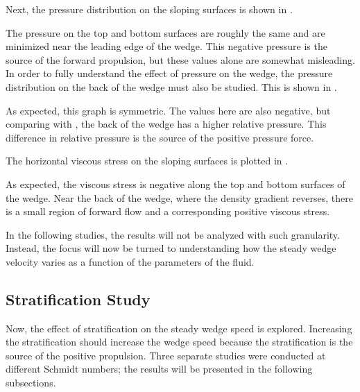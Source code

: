 \documentclass[12pt]{article}
\begin{document}
Next, the pressure distribution on the sloping surfaces is shown in .


The pressure on the top and bottom surfaces are roughly the same and are minimized near the leading edge of the wedge. This negative pressure is the source of the forward propulsion, but these values alone are somewhat misleading. In order to fully understand the effect of pressure on the wedge, the pressure distribution on the back of the wedge must also be studied. This is shown in .


As expected, this graph is symmetric. The values here are also negative, but comparing with , the back of the wedge has a higher relative pressure. This difference in relative pressure is the source of the positive pressure force.

The horizontal viscous stress on the sloping surfaces is plotted in .


As expected, the viscous stress is negative along the top and bottom surfaces of the wedge. Near the back of the wedge, where the density gradient reverses, there is a small region of forward flow and a corresponding positive viscous stress.

In the following studies, the results will not be analyzed with such granularity. Instead, the focus will now be turned to understanding how the steady wedge velocity varies as a function of the parameters of the fluid.

\subsection{Stratification Study}

Now, the effect of stratification on the steady wedge speed is explored. Increasing the stratification should increase the wedge speed because the stratification is the source of the positive propulsion. Three separate studies were conducted at different Schmidt numbers; the results will be presented in the following subsections.
\end{document}
